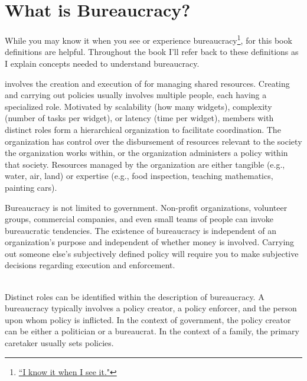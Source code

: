 \section{What is Bureaucracy?\label{sec:define-bureaucracy}}

While you may know it when you see or experience bureaucracy\footnote{\href{https://en.wikipedia.org/wiki/I_know_it_when_I_see_it}{``I know it when I see it."}}, for this book definitions are helpful. Throughout the book I'll refer back to these definitions as I explain concepts needed to understand bureaucracy.

\marginpar{[Glossary]}
\iftoggle{glossarysubstitutionworks}{\Gls{bureaucracy}}{Bureaucracy} involves the creation and execution of 
\iftoggle{glossarysubstitutionworks}{\glspl{policy}}{policies} for managing shared resources. 
Creating and carrying out policies usually involves multiple people, each having a specialized role. Motivated by scalability (how many widgets), complexity (number of tasks per widget), or latency (time per widget), members with distinct roles form a hierarchical organization to facilitate coordination. The organization has control over the disbursement of resources relevant to the society the organization works within, or the organization administers a policy within that society. Resources managed by the organization are either tangible (e.g., water, air, land) or expertise (e.g., food inspection, teaching mathematics, painting cars).  

Bureaucracy is not limited to government. Non-profit organizations, volunteer groups, commercial companies, and even small teams of people can invoke bureaucratic tendencies. The existence of bureaucracy is independent of an organization's purpose and independent of whether money is involved. Carrying out someone else's subjectively defined policy will require you to make subjective decisions regarding execution and enforcement. 

\ \\

Distinct roles can be identified within the description of bureaucracy.
A bureaucracy typically involves a policy creator, a policy enforcer, and the person upon whom policy is inflicted. In the context of government, the policy creator can be either a politician or a bureaucrat. In the context of a family, the primary caretaker usually sets policies.


